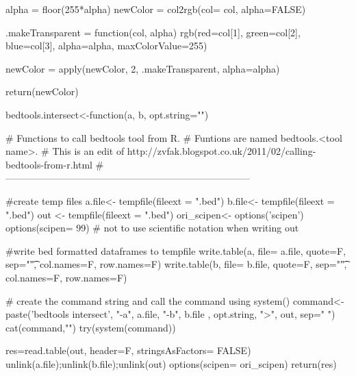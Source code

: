 \begin{sverbatim}
{  alpha = floor(255*alpha)
  newColor = col2rgb(col= col, alpha=FALSE)

  .makeTransparent = function(col, alpha) {
    rgb(red=col[1], green=col[2], blue=col[3], alpha=alpha, maxColorValue=255)
  }

  newColor = apply(newColor, 2, .makeTransparent, alpha=alpha)

  return(newColor)
}


bedtools.intersect<-function(a, b, opt.string=""){
    # Functions to call bedtools tool from R. 
    # Funtions are named bedtools.<tool name>.
    # This is an edit of http://zvfak.blogspot.co.uk/2011/02/calling-bedtools-from-r.html
    # -----------------------------------------------------------------------------

    #create temp files
    a.file<- tempfile(fileext = ".bed")
    b.file<- tempfile(fileext = ".bed")
    out   <- tempfile(fileext = ".bed")
    ori_scipen<- options('scipen')
    options(scipen= 99) # not to use scientific notation when writing out
    
    #write bed formatted dataframes to tempfile
    write.table(a, file= a.file, quote=F, sep="\t", col.names=F, row.names=F)
    write.table(b, file= b.file, quote=F, sep="\t", col.names=F, row.names=F)
    
    # create the command string and call the command using system()
    command<- paste('bedtools intersect', "-a", a.file, "-b", b.file , opt.string, ">",
        out, sep=" ")
    cat(command,"\n")
    try(system(command))
    
    res=read.table(out, header=F, stringsAsFactors= FALSE)
    unlink(a.file);unlink(b.file);unlink(out)
    options(scipen= ori_scipen)
    return(res)
}
\end{sverbatim} %